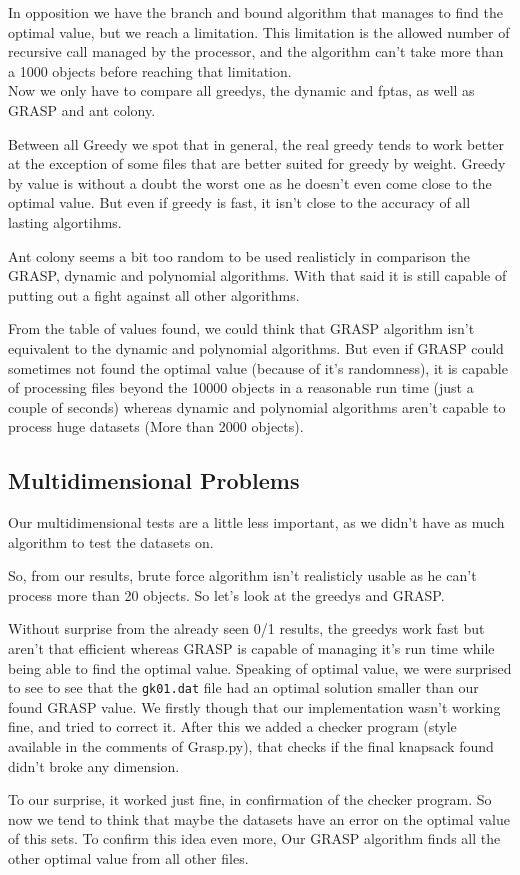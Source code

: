 \documentclass[a4paper, 11pt]{article}
\begin{document}
        In opposition we have the branch and bound algorithm that manages to find the optimal value, but we reach a limitation. This limitation is the allowed number of recursive call managed by the processor, and the algorithm can't take more than a 1000 objects before reaching that limitation.\\
        Now we only have to compare all greedys, the dynamic and fptas, as well as GRASP and ant colony.

        Between all Greedy we spot that in general, the real greedy tends to work better at the exception of some files that are better suited for greedy by weight. Greedy by value is without a doubt the worst one as he doesn't even come close to the optimal value. But even if greedy is fast, it isn't close to the accuracy of all lasting algortihms.

        Ant colony seems a bit too random to be used realisticly in comparison the GRASP, dynamic and polynomial algorithms. With that said it is still capable of putting out a fight against all other algorithms.

        
        From the table of values found, we could think that GRASP algorithm isn't equivalent to the dynamic and polynomial algorithms. But even if GRASP could sometimes not found the optimal value (because of it's randomness), it is capable of processing files beyond the 10000 objects in a reasonable run time (just a couple of seconds) whereas dynamic and polynomial algorithms aren't capable to process huge datasets (More than 2000 objects).

        \subsection{Multidimensional Problems}

        Our multidimensional tests are a little less important, as we didn't have as much algorithm to test the datasets on.

        So, from our results, brute force algorithm isn't realisticly usable as he can't process more than 20 objects. So let's look at the greedys and GRASP.

        Without surprise from the already seen 0/1 results, the greedys work fast but aren't that efficient whereas GRASP is capable of managing it's run time while being able to find the optimal value. Speaking of optimal value, we were surprised to see to see that the \verb+gk01.dat+ file had an optimal solution smaller than our found GRASP value. We firstly though that our implementation wasn't working fine, and tried to correct it. After this we added a checker program (style available in the comments of Grasp.py), that checks if the final knapsack found didn't broke any dimension.\par
        To our surprise, it worked just fine, in confirmation of the checker program. So now we tend to think that maybe the datasets have an error on the optimal value of this sets. To confirm this idea even more, Our GRASP algorithm finds all the other optimal value from all other files.
\end{document}
